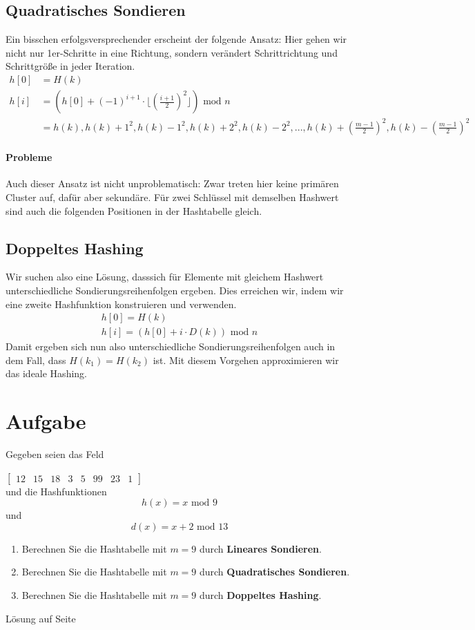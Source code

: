 \documentclass[11pt,a4paper]{scrartcl}
\begin{document}
\subsection{Quadratisches Sondieren}
Ein bisschen erfolgsversprechender erscheint der folgende Ansatz: Hier gehen wir nicht nur 1er-Schritte in eine Richtung, sondern verändert Schrittrichtung und Schrittgröße in jeder Iteration.
\begin{align*}
h[0] &= H(k) \\
h[i] &= (h[0] + (-1)^{i+1} \cdot \lfloor (\frac{i+1}{2})^2 \rfloor) \text{ mod } n \\
&= h(k), h(k) + 1^2, h(k) - 1^2, h(k) + 2^2, h(k) - 2^2, ..., h(k) + (\frac{m-1}{2})^2, h(k) - (\frac{m-1}{2})^2
\end{align*} 
\paragraph{Probleme} Auch dieser Ansatz ist nicht unproblematisch: Zwar treten hier keine primären Cluster auf, dafür aber sekundäre. Für zwei Schlüssel mit demselben Hashwert sind auch die folgenden Positionen in der Hashtabelle gleich.
\subsection{Doppeltes Hashing}
Wir suchen also eine Lösung, dasssich für Elemente mit gleichem Hashwert unterschiedliche Sondierungsreihenfolgen ergeben. Dies erreichen wir, indem wir eine zweite Hashfunktion konstruieren und verwenden.
\begin{align*}
h[0] = H(k) \\
h[i] = (h[0] + i \cdot D(k)) \text{ mod } n
\end{align*}
Damit ergeben sich nun also unterschiedliche Sondierungsreihenfolgen auch in dem Fall, dass $H(k_1) = H(k_2)$ ist. Mit diesem Vorgehen approximieren wir das ideale Hashing.
\section*{Aufgabe}
Gegeben seien das Feld \\
\begin{center}
$\left[ \begin{array}{rrrrrrrr}
12 & 15 & 18 & 3 & 5 & 99 & 23 & 1
\end{array} \right]$ \\ und die Hashfunktionen 
\[h(x) = x \text{ mod } 9\] und
\[d(x) = x + 2 \text{ mod } 13\]
\end{center}
\begin{enumerate}
\item Berechnen Sie die Hashtabelle mit $m = 9$ durch \textbf{Lineares Sondieren}.
\item Berechnen Sie die Hashtabelle mit $m = 9$ durch \textbf{Quadratisches Sondieren}.
\item Berechnen Sie die Hashtabelle mit $m = 9$ durch \textbf{Doppeltes Hashing}.
\end{enumerate}
\begin{flushright}
Lösung auf Seite \pageref{a7:lsg}
\end{flushright}
\pagebreak
\end{document}
